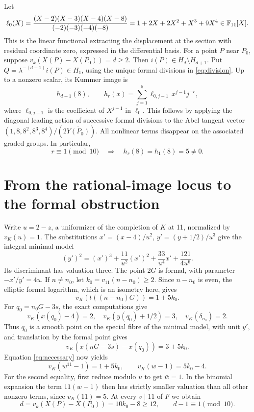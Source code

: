 \documentclass[11pt]{article}
\begin{document}
Let
\[
 \ell_0(X)=\frac{(X-2)(X-3)(X-4)(X-8)}{(-2)(-3)(-4)(-8)}
 =1+2X+2X^2+X^3+9X^4\in\mathbb F_{11}[X].
\]
This is the linear functional extracting the displacement at the section
with residual coordinate zero, expressed in the differential basis.
For a point \(P\) near \(P_0\), suppose \(v_k(X(P)-X(P_0))=d\ge2\).
Then \(i(P)\in H_d\setminus H_{d+1}\). Put
\(Q=\lambda^{-(d-1)}i(P)\in H_1\), using the unique formal divisions
in \eqref{eq:division}. Up to a nonzero scalar, its Kummer image is
\begin{equation}\label{eq:leading}
 h_{d-1}(8),\qquad
 h_r(x)=\sum_{j=1}^5\ell_{0,j-1}\,x^{j-1}j^{-r},
\end{equation}
where \(\ell_{0,j-1}\) is the coefficient of \(X^{j-1}\) in \(\ell_0\).
This follows by applying the diagonal leading action of successive
formal divisions to the Abel tangent vector
\((1,8,8^2,8^3,8^4)/(2\overline{Y(P_0)})\).
All nonlinear terms disappear on the associated graded groups.
In particular,
\begin{equation}\label{eq:five}
 r\equiv1\pmod{10}\quad\Longrightarrow\quad h_r(8)=h_1(8)=5\ne0.
\end{equation}

\section{From the rational-image locus to the formal obstruction}
Write \(u=2-z\), a uniformizer of the completion of \(K\) at 11,
normalized by \(v_K(u)=1\). The substitutions
\(x'=(x-4)/u^2\), \(y'=(y+1/2)/u^3\) give the integral minimal model
\[
 (y')^2=(x')^3+\frac{11}{u^2}(x')^2+
 \frac{33}{u^4}x'+\frac{121}{4u^6}.
\]
Its discriminant has valuation three. The point \(2G\) is formal, with
parameter \(-x'/y'=4u\). If \(n\ne n_0\), let
\(k_0=v_{11}(n-n_0)\ge2\). Since \(n-n_0\) is even, the elliptic
formal logarithm, which is an isometry here, gives
\[
 v_K(t((n-n_0)G))=1+5k_0.
\]
For \(q_0=n_0G-3s\), the exact computations give
\[
 v_K(x(q_0)-4)=2,\quad v_K(y(q_0)+1/2)=3,
 \quad v_K(\delta_{n_0})=2.
\]
Thus \(q_0\) is a smooth point on the special fibre of the minimal
model, with unit \(y'\), and translation by the formal point gives
\[
 v_K(x(nG-3s)-x(q_0))=3+5k_0.
\]
Equation \eqref{eq:necessary} now yields
\[
 v_K(w^{11}-1)=1+5k_0,
 \qquad v_K(w-1)=5k_0-4.
\]
For the second equality, first reduce modulo \(u\) to get \(\bar w=1\).
In the binomial expansion the term \(11(w-1)\) then has strictly
smaller valuation than all other nonzero terms, since \(v_K(11)=5\).
At every \(v\mid11\) of \(F\) we obtain
\begin{equation}\label{eq:d}
 d=v_k(X(P)-X(P_0))=10k_0-8\ge12,
 \qquad d-1\equiv1\pmod{10}.
\end{equation}
\end{document}
